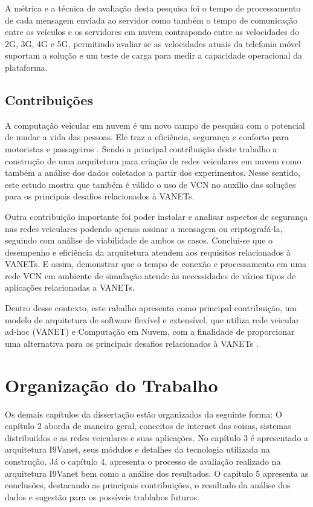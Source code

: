 \documentclass[
	12pt,				%
	oneside,			%
	a4paper,			%
	english,			%
	brazil				%
	]{abntex2ppgsi}
\begin{document}
A métrica e a técnica de avaliação desta pesquisa foi o tempo de processamento de cada mensagem enviada ao servidor como também o tempo de comunicação entre os veículos e os servidores em nuvem contrapondo entre as velocidades do 2G, 3G, 4G e 5G, permitindo avaliar se as velocidades atuais da telefonia móvel suportam a solução e um teste de carga para medir a capacidade operacional da plataforma.
 
\subsection{Contribuições}

A computação veicular em nuvem é um novo campo de pesquisa com o potencial de mudar a vida das pessoas. Ele  traz a eficiência, segurança e conforto para motoristas e passageiros \cite{falchetti2015vehicular}. Sendo a principal contribuição deste trabalho a construção de uma arquitetura para criação de redes veiculares em nuvem como também a análise dos dados coletados a partir dos experimentos. Nesse sentido, este estudo mostra que também é válido o uso de VCN no auxílio das soluções para os principais desafios relacionados à VANETs.

Outra contribuição importante foi poder instalar e analisar aspectos de segurança nas redes veiculares podendo apenas assinar a mensagem ou criptografá-la, seguindo com análise de viabilidade de ambos os casos. Conclui-se que o desempenho e eficiência da arquitetura atendem aos requisitos relacionados à VANETs. E assim, demonstrar que o tempo de conexão e processamento em uma rede VCN em ambiente de simulação atende às necessidades de vários tipos de aplicações relacionadas a VANETs.

Dentro desse contexto, este rabalho apresenta como principal contribuição, um modelo de arquitetura de software flexível e extensível, que utiliza rede veicular ad-hoc (VANET) e  Computação em Nuvem, com a finalidade de proporcionar uma alternativa para os principais desafios relacionados à VANETs .


\section{Organização do Trabalho}
Os demais capítulos da dissertação estão organizados da seguinte forma:
O capítulo 2 aborda de maneira geral, conceitos de internet das coisas, sistemas distribuiídos e as redes veiculares e suas aplicações. No capítulo 3 é apresentado a arquitetura I9Vanet, seus módulos e detalhes da tecnologia utilizada na construção. Já o capítulo 4, apresenta o processo de avaliação realizado na arquitetura I9Vanet bem como a análise dos resultados.
O capítulo 5 apresenta as conclusões, destacando as principais contribuições, o resultado da análise dos dados e sugestão para os possíveis trablahos futuros.
\end{document}

